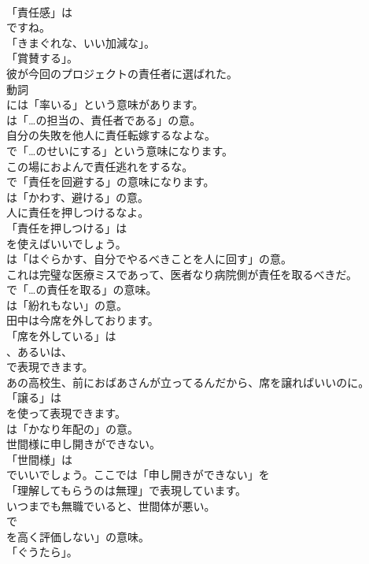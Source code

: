 \documentclass[8pt]{extreport}
\begin{document}
\begin{CJK}{UTF8}{min}
\\	「責任感」は
\\	ですね。
\\	「きまぐれな、いい加減な」。
\\	「賞賛する」。	
\\	彼が今回のプロジェクトの責任者に選ばれた。 
\\	動詞
\\	には「率いる」という意味があります。
\\	は「…の担当の、責任者である」の意。	
\\	自分の失敗を他人に責任転嫁するなよな。 
\\	で「…のせいにする」という意味になります。	
\\	この場におよんで責任逃れをするな。 
\\	で「責任を回避する」の意味になります。
\\	は「かわす、避ける」の意。	
\\	人に責任を押しつけるなよ。 
\\	「責任を押しつける」は
\\	を使えばいいでしょう。
\\	は「はぐらかす、自分でやるべきことを人に回す」の意。	
\\	これは完璧な医療ミスであって、医者なり病院側が責任を取るべきだ。 
\\	で「…の責任を取る」の意味。
\\	は「紛れもない」の意。	
\\	田中は今席を外しております。 
\\	「席を外している」は
\\	、あるいは、
\\	で表現できます。	
\\	あの高校生、前におばあさんが立ってるんだから、席を譲ればいいのに。 
\\	「譲る」は 
\\	を使って表現できます。
\\	は「かなり年配の」の意。	
\\	世間様に申し開きができない。 
\\	「世間様」は
\\	でいいでしょう。ここでは「申し開きができない」を
\\	「理解してもらうのは無理」で表現しています。	
\\	いつまでも無職でいると、世間体が悪い。 
\\	で
\\	を高く評価しない」の意味。
\\	「ぐうたら」。	

\end{CJK}
\end{document}
